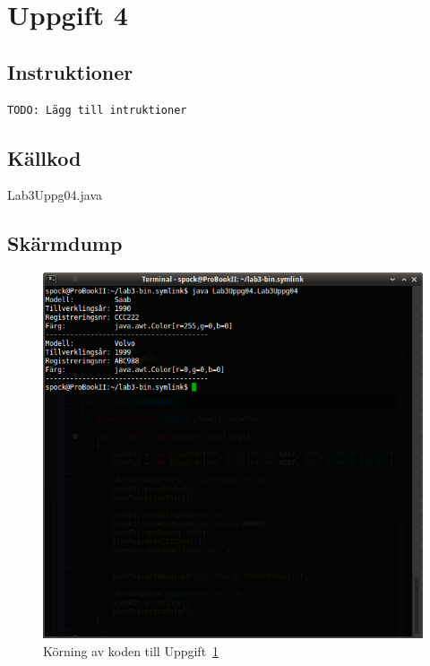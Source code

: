 \section{Uppgift 4}\label{sec:uppg04}

\subsection{Instruktioner}
\begin{verbatim}
TODO: Lägg till intruktioner
\end{verbatim}


\subsection{Källkod}
\caption{Lab3Uppg04.java}
\label{src:uppg04}


\subsection{Skärmdump}
\begin{figure}[htbp]
    \centering
        \includegraphics[width=\linewidth]{img/04.png}
    \caption{Körning av koden till Uppgift~\ref{sec:uppg04}}
    \label{fig:uppg04-screenshot}
\end{figure}

